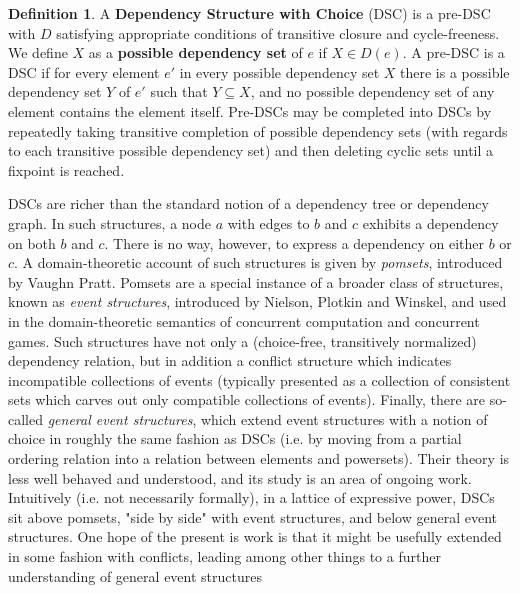 \documentclass[hoptionsi,review,format=sigplan]{acmart}
\theoremstyle{definition}
\newtheorem{definition}{Definition}[section]
\begin{document}
\begin{definition}
A \textbf{Dependency Structure with Choice} (DSC) is a pre-DSC with \(D\) satisfying  appropriate conditions of transitive closure and cycle-freeness. We define \(X\) as a \textbf{possible dependency set} of \(e\) if \(X \in D(e)\). A pre-DSC is a DSC if for every element \(e'\) in every possible dependency set \(X\) there is a possible dependency set \(Y\) of \(e'\) such that \(Y \subseteq X\), and no possible dependency set of any element contains the element itself. Pre-DSCs may be completed into DSCs by repeatedly taking transitive completion of possible dependency sets (with regards to each transitive possible dependency set) and then deleting cyclic sets until a fixpoint is reached.
\end{definition}



DSCs are richer than the standard notion of a dependency tree or dependency graph. In such structures, a node \(a\) with edges to \(b\) and \(c\) exhibits a dependency on both \(b\) and \(c\). There is no way, however, to express a dependency on either \(b\) or \(c\). A domain-theoretic account of such structures is given by \textit{pomsets}, introduced by Vaughn Pratt. Pomsets are a special instance of a broader class of structures, known as \textit{event structures}, introduced by Nielson, Plotkin and Winskel, and used in the domain-theoretic semantics of concurrent computation and concurrent games. Such structures have not only a (choice-free, transitively normalized) dependency relation, but in addition a conflict structure which indicates incompatible collections of events (typically presented as a collection of consistent sets which carves out only compatible collections of events). Finally, there are so-called \textit{general event structures}, which extend event structures with a notion of choice in roughly the same fashion as DSCs (i.e. by moving from a partial ordering relation into a relation between elements and powersets). Their theory is less well behaved and understood, and its study is an area of ongoing work. Intuitively (i.e. not necessarily formally), in a lattice of expressive power, DSCs sit above pomsets, "side by side" with event structures, and below general event structures.  One hope of the present is work is that it might be usefully extended in some fashion with conflicts, leading among other things to a further understanding of general event structures
\end{document}
